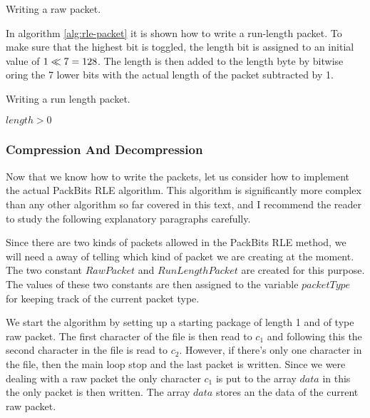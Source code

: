 \begin{algorithm}
  \caption{Writing a raw packet.}
  \label{alg:raw-packet}
  \begin{algorithmic}[1]
    \State {}
    \State {}
    \EndForEach
    \EndFunction
  \end{algorithmic}
\end{algorithm}

In algorithm \ref{alg:rle-packet} it is shown how to write a
run-length packet. To make sure that the highest bit is toggled, the
length bit is assigned to an initial value of $1 \ll 7 =
128$. The length is then added to the length byte by bitwise oring the
7 lower bits with the actual length of the packet subtracted by 1.

\begin{algorithm}
  \caption{Writing a run length packet.}
  \label{alg:rle-packet}
  \begin{algorithmic}[1]
    \Require $length > 0$
    \State {}
    \State {}
    \EndFunction
  \end{algorithmic}
\end{algorithm}

\subsubsection{Compression And Decompression}
\label{sec:compr-decompr}

Now that we know how to write the packets, let us consider how to
implement the actual PackBits RLE algorithm. This algorithm is
significantly more complex than any other algorithm so far covered in
this text, and I recommend the reader to study the following
explanatory paragraphs carefully.

Since there are two kinds of packets allowed in the PackBits RLE
method, we will need a away of telling which kind of packet we are
creating at the moment. The two constant $RawPacket$ and
$RunLengthPacket$ are created for this purpose. The values of these
two constants are then assigned to the variable $packetType$ for
keeping track of the current packet type.

We start the algorithm by setting up a starting package of length 1
and of type raw packet. The first character of the file is then read
to $c_1$ and following this the second character in the file is read
to $c_2$. However, if there's only one character in the file, then the
main loop stop and the last packet is written. Since we were dealing
with a raw packet the only character $c_1$ is put to the array $data$
in this the only packet is then written. The array $data$ stores an
the data of the current raw packet.

